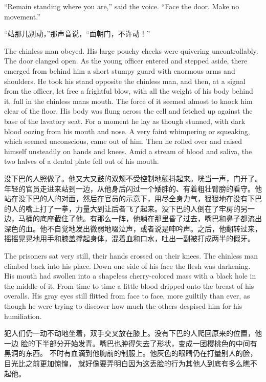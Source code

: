 \begin{paracol}{2}
\switchcolumn*

``Remain standing where you are,'' said the voice. ``Face the door. Make no
movement.''

\switchcolumn

``站那儿别动，''那声音说，``面朝门，不许动！''

\switchcolumn*

The chinless man obeyed. His large pouchy cheeks were quivering
uncontrollably. The door clanged open. As the young officer entered and
stepped aside, there emerged from behind him a short stumpy guard with
enormous arms and shoulders. He took his stand opposite the chinless
man, and then, at a signal from the officer, let free a frightful blow,
with all the weight of his body behind it, full in the chinless
man\textquotesingle s mouth. The force of it seemed almost to knock him
clear of the floor. His body was flung across the cell and fetched up
against the base of the lavatory seat. For a moment he lay as though
stunned, with dark blood oozing from his mouth and nose. A very faint
whimpering or squeaking, which seemed unconscious, came out of him. Then
he rolled over and raised himself unsteadily on hands and knees. Amid a
stream of blood and saliva, the two halves of a dental plate fell out of
his mouth.

\switchcolumn

没下巴的人照做了。他又大又鼓的双颊不受控制地颤抖起来。咣当一声，门开了。年轻的官员走进来站到一边，从他身后闪过一个矮胖的、有着粗壮臂膀的看守。他站在没下巴的人的对面，然后在官员的示意下，用尽全身力气，狠狠地在没有下巴的人的嘴上打了一拳，力量大到让后者飞了起来。没下巴的人倒在了牢房的另一边，马桶的底座截住了他。有那么一阵，他躺在那里昏了过去，嘴巴和鼻子都流出深色的血。他不自觉地发出微弱地啜泣声，或者说是呻吟声。之后，他翻转过来，摇摇晃晃地用手和膝盖撑起身体，混着血和口水，吐出一副被打成两半的假牙。

\switchcolumn*

The prisoners sat very still, their hands crossed on their knees. The
chinless man climbed back into his place. Down one side of his face the
flesh was darkening. His mouth had swollen into a shapeless
cherry-colored mass with a black hole in the middle of it. From time to
time a little blood dripped onto the breast of his overalls. His gray
eyes still flitted from face to face, more guiltily than ever, as though
he were trying to discover how much the others despised him for his
humiliation.

\switchcolumn

犯人们仍一动不动地坐着，双手交叉放在膝上。没有下巴的人爬回原来的位置，他一边
脸的下半部分开始发青。嘴巴也肿得失去了形状，变成一团樱桃色的中间有黑洞的东西。
不时有血滴到他胸前的制服上。他灰色的眼睛仍在打量别人的脸，目光比之前更加惊惶，
就好像要弄明白因为这丢脸的行为其他人到底有多么瞧不起他。


\end{paracol}
